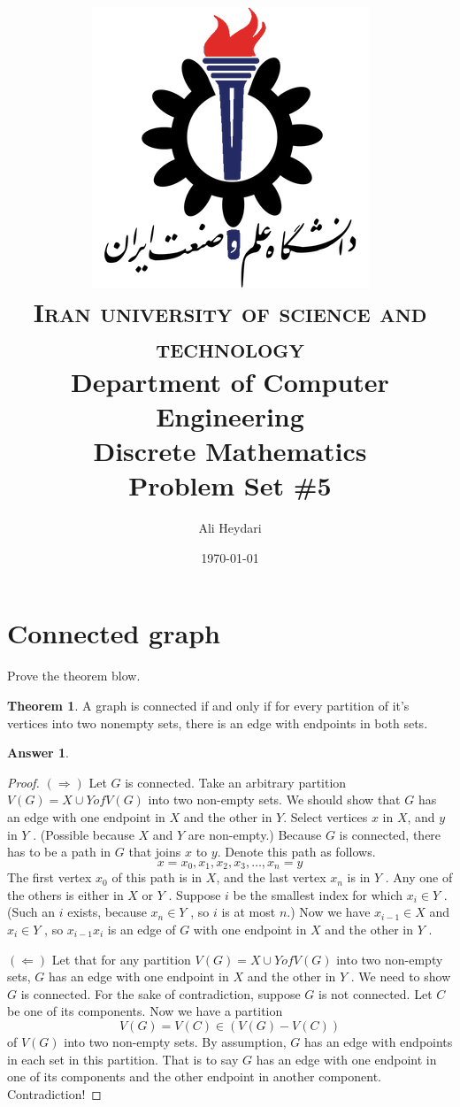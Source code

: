 \documentclass[a4paper]{article}
\title{
\textsc{
\center
\includegraphics[scale=0.5]{IUST_logo_color} \\
Iran university of science and technology} \\ [5pt] %
Department of Computer Engineering \\[8pt]
Discrete Mathematics\\Problem Set \#5 \\
}
\author{Ali Heydari}
\date{\today}
\renewcommand{\(}{\left(}
\renewcommand{\)}{\right)}
\theoremstyle{plain}
\theoremstyle{plain}
\theoremstyle{definition}
\newtheorem*{answer}{Answer}
\newtheorem{theorem}{Theorem}[section]
\begin{document}
\maketitle
\tableofcontents
\pagebreak

\section{Connected graph}
Prove the theorem blow.
\begin{theorem}
A graph is connected if and only if for every partition of it's vertices into two nonempty sets, there
is an edge with endpoints in both sets.
\end{theorem}
\begin{shaded}
\begin{answer}
\begin{proof}
$(\Rightarrow)$ Let $G$ is connected. Take an arbitrary partition $V (G) = X \cup Y of V (G)$ into two non-empty sets. We should show that $G$ has an edge with one endpoint in $X$ and the other in $Y$. Select vertices $x$ in $X$, and $y$ in $Y$ . (Possible because $X$ and $Y$ are non-empty.) Because $G$ is connected, there has to be a path in $G$ that joins $x$ to $y$. Denote this path as follows.
$$x = x_0, x_1, x_2, x_3, \dots , x_n = y$$
The first vertex $x_0$ of this path is in $X$, and the last vertex $x_n$ is in $Y$ . Any one of the others is either in $X$ or $Y$ . Suppose $i$ be the smallest index for which $x_i \in Y$ . (Such an $i$ exists, because $x_n \in Y$ , so $i$ is at most $n$.) Now we have $x_{i-1} \in X$ and $x_i \in Y$ , so $x_{i-1}x_i$
is an edge of $G$ with one endpoint in $X$ and the other in $Y$ .

$(\Leftarrow)$ Let that for any partition $V (G) = X \cup Y of V (G)$ into two non-empty sets, $G$ has an edge with one endpoint in $X$ and the other in $Y$ . We need to show $G$ is connected. For the sake of contradiction, suppose $G$ is not connected. Let $C$ be one of its components. Now we have a partition
$$V (G) = V (C) \in (V (G) − V (C))$$
 of $V (G)$ into two non-empty sets. By assumption, $G$ has an edge with endpoints in each set in this partition. That is to say $G$ has an edge with one endpoint in one of its components and the other endpoint in another component. Contradiction!
 \end{proof}
\end{answer}
\end{shaded}
\end{document}
